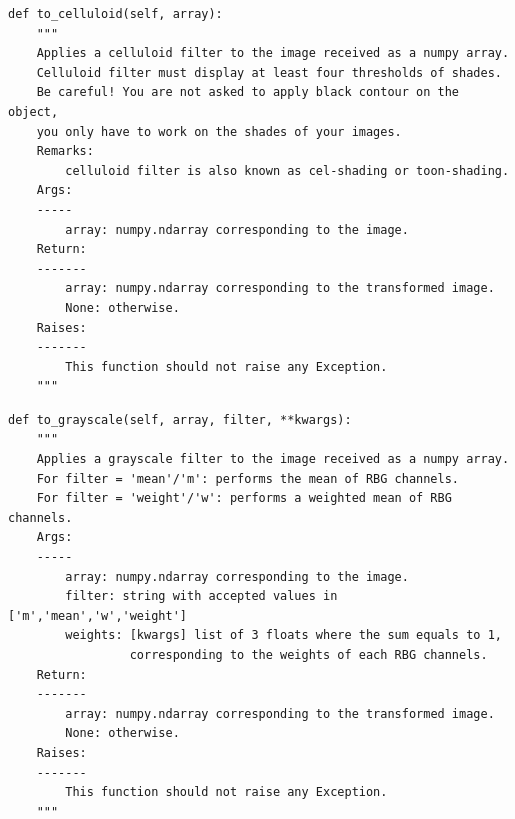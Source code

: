 \documentclass{42-en}
\begin{document}
\begin{verbatim}
def to_celluloid(self, array):
    """
    Applies a celluloid filter to the image received as a numpy array.
    Celluloid filter must display at least four thresholds of shades.
    Be careful! You are not asked to apply black contour on the object,
    you only have to work on the shades of your images.
    Remarks:
        celluloid filter is also known as cel-shading or toon-shading.
    Args:
    -----
        array: numpy.ndarray corresponding to the image.
    Return:
    -------
        array: numpy.ndarray corresponding to the transformed image.
        None: otherwise.
    Raises:
    -------
        This function should not raise any Exception.
    """
\end{verbatim}
\begin{verbatim}
def to_grayscale(self, array, filter, **kwargs):
    """
    Applies a grayscale filter to the image received as a numpy array.
    For filter = 'mean'/'m': performs the mean of RBG channels.
    For filter = 'weight'/'w': performs a weighted mean of RBG channels.
    Args:
    -----
        array: numpy.ndarray corresponding to the image.
        filter: string with accepted values in ['m','mean','w','weight']
        weights: [kwargs] list of 3 floats where the sum equals to 1,
                 corresponding to the weights of each RBG channels.
    Return:
    -------
        array: numpy.ndarray corresponding to the transformed image.
        None: otherwise.
    Raises:
    -------
        This function should not raise any Exception.
    """
\end{verbatim}
\end{document}
